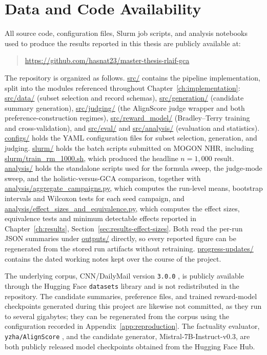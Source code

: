 \chapter{Data and Code Availability}
\label{app:availability}

All source code, configuration files, Slurm job scripts, and analysis notebooks
used to produce the results reported in this thesis are publicly available at:

\begin{quote}
\url{https://github.com/hasnat23/master-thesis-rlaif-gca}
\end{quote}

The repository is organized as follows. \url{src/} contains the pipeline
implementation, split into the modules referenced throughout
Chapter~\ref{ch:implementation}: \url{src/data/} (subset selection and record
schemas), \url{src/generation/} (candidate summary generation),
\url{src/judging/} (the AlignScore judge wrapper and both preference-construction
regimes), \url{src/reward_model/} (Bradley--Terry training and cross-validation),
and \url{src/eval/} and \url{src/analysis/} (evaluation and statistics).
\url{configs/} holds the YAML configuration files for subset selection,
generation, and judging. \url{slurm/} holds the batch scripts submitted on MOGON
NHR, including \url{slurm/train_rm_1000.sh}, which produced the headline
$n=1{,}000$ result. \url{analysis/} holds the standalone scripts used for the
formula sweep, the judge-mode sweep, and the holistic-versus-GCA comparison,
together with \url{analysis/aggregate_campaigns.py}, which computes the
run-level means, bootstrap intervals and Wilcoxon tests for each seed campaign,
and \url{analysis/effect_sizes_and_equivalence.py}, which computes the effect
sizes, equivalence tests and minimum detectable effects reported in
Chapter~\ref{ch:results}, Section~\ref{sec:results-effect-sizes}. Both read the
per-run JSON summaries under \url{outputs/} directly, so every reported figure
can be regenerated from the stored run artifacts without retraining.
\url{progress-updates/} contains the dated working notes kept over the course of
the project.

The underlying corpus, CNN/DailyMail version \texttt{3.0.0}
\citep{hermann2015teaching, nallapati2016abstractive}, is publicly available
through the Hugging Face \texttt{datasets} library and is not redistributed in the
repository. The candidate summaries, preference files, and trained reward-model
checkpoints generated during this project are likewise not committed, as they run
to several gigabytes; they can be regenerated from the corpus using the
configuration recorded in Appendix~\ref{app:reproduction}. The factuality
evaluator, \texttt{yzha/AlignScore} \citep{zha2023alignscore}, and the candidate
generator, Mistral-7B-Instruct-v0.3, are both publicly released model checkpoints
obtained from the Hugging Face Hub.

